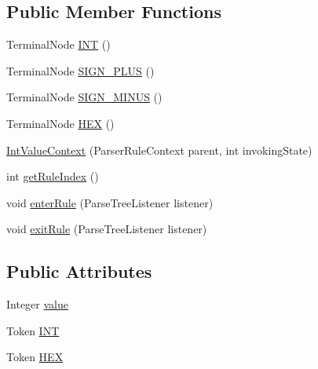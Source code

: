 \subsection*{Public Member Functions}
\begin{DoxyCompactItemize}
\item 
Terminal\+Node \hyperlink{classgov_1_1nasa_1_1jpf_1_1inspector_1_1client_1_1parser_1_1_console_grammar_parser_1_1_int_value_context_a874472686ce017b9c07c5c861cda9b26}{I\+NT} ()
\item 
Terminal\+Node \hyperlink{classgov_1_1nasa_1_1jpf_1_1inspector_1_1client_1_1parser_1_1_console_grammar_parser_1_1_int_value_context_ac6dc6c30bb43cb7685c9d85660f951d0}{S\+I\+G\+N\+\_\+\+P\+L\+US} ()
\item 
Terminal\+Node \hyperlink{classgov_1_1nasa_1_1jpf_1_1inspector_1_1client_1_1parser_1_1_console_grammar_parser_1_1_int_value_context_aab68acdc35adccb4f61aeb1369ebe3e3}{S\+I\+G\+N\+\_\+\+M\+I\+N\+US} ()
\item 
Terminal\+Node \hyperlink{classgov_1_1nasa_1_1jpf_1_1inspector_1_1client_1_1parser_1_1_console_grammar_parser_1_1_int_value_context_aa3a99b4c6967d8b9ae99d603e838ced6}{H\+EX} ()
\item 
\hyperlink{classgov_1_1nasa_1_1jpf_1_1inspector_1_1client_1_1parser_1_1_console_grammar_parser_1_1_int_value_context_a66b3fc61357403103864889ce88202bb}{Int\+Value\+Context} (Parser\+Rule\+Context parent, int invoking\+State)
\item 
int \hyperlink{classgov_1_1nasa_1_1jpf_1_1inspector_1_1client_1_1parser_1_1_console_grammar_parser_1_1_int_value_context_af7b489560d62d9bed1e0184088c3fb64}{get\+Rule\+Index} ()
\item 
void \hyperlink{classgov_1_1nasa_1_1jpf_1_1inspector_1_1client_1_1parser_1_1_console_grammar_parser_1_1_int_value_context_a3ac7bfcf9c0f48f325fcd835746e5ac9}{enter\+Rule} (Parse\+Tree\+Listener listener)
\item 
void \hyperlink{classgov_1_1nasa_1_1jpf_1_1inspector_1_1client_1_1parser_1_1_console_grammar_parser_1_1_int_value_context_ab00fc3e39b7dd8a75d2e3b22a9e6eb76}{exit\+Rule} (Parse\+Tree\+Listener listener)
\end{DoxyCompactItemize}
\subsection*{Public Attributes}
\begin{DoxyCompactItemize}
\item 
Integer \hyperlink{classgov_1_1nasa_1_1jpf_1_1inspector_1_1client_1_1parser_1_1_console_grammar_parser_1_1_int_value_context_a47964dd9f967981f0b77c57b35833709}{value}
\item 
Token \hyperlink{classgov_1_1nasa_1_1jpf_1_1inspector_1_1client_1_1parser_1_1_console_grammar_parser_1_1_int_value_context_aab107d69891a0998e8a1236175dda33d}{I\+NT}
\item 
Token \hyperlink{classgov_1_1nasa_1_1jpf_1_1inspector_1_1client_1_1parser_1_1_console_grammar_parser_1_1_int_value_context_af63813be738f90dbf1de9e2fb36aa35e}{H\+EX}
\end{DoxyCompactItemize}


